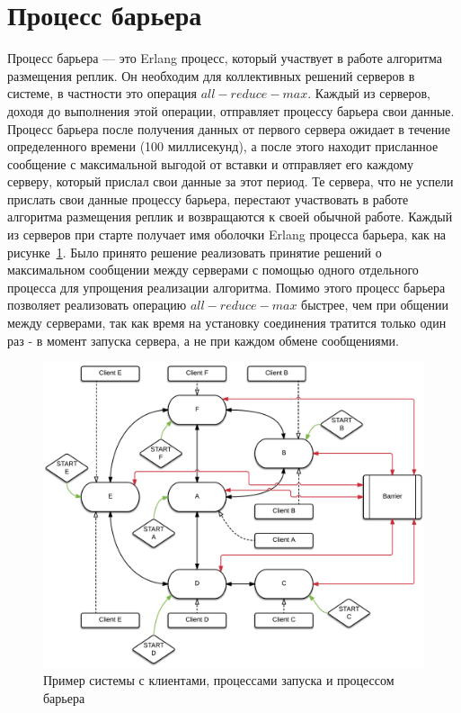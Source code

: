 	\section{Процесс барьера}
		Процесс барьера --- это Erlang процесс, который участвует в работе алгоритма размещения реплик. Он необходим для коллективных решений серверов в системе,
		в частности это операция $all-reduce-max$. Каждый из серверов, доходя до выполнения этой операции, отправляет процессу барьера свои данные. Процесс барьера
		после получения данных от первого сервера ожидает в течение определенного времени (100 миллисекунд), а после этого находит присланное сообщение с максимальной 
		выгодой от вставки и отправляет его каждому серверу, который прислал свои данные за этот период. Те сервера, что не успели прислать свои данные процессу 
		барьера, перестают участвовать в работе алгоритма размещения реплик и возвращаются к своей обычной работе. Каждый из серверов при старте получает имя оболочки
		Erlang процесса барьера, как на рисунке~\ref{fig:br}. Было принято решение реализовать принятие решений о максимальном сообщении между серверами с помощью одного отдельного процесса
		для упрощения реализации алгоритма. Помимо этого процесс барьера позволяет реализовать операцию $all-reduce-max$ быстрее, чем при общении между серверами,
		так как время на установку соединения тратится только один раз - в момент запуска сервера, а не при каждом обмене сообщениями.
		
		\begin{figure}[H] 
			\centering 
			\includegraphics[width=\textwidth]{img/barrier.png}
			\caption{Пример системы с клиентами, процессами запуска и процессом барьера} 
			\label{fig:br}
		\end{figure}


